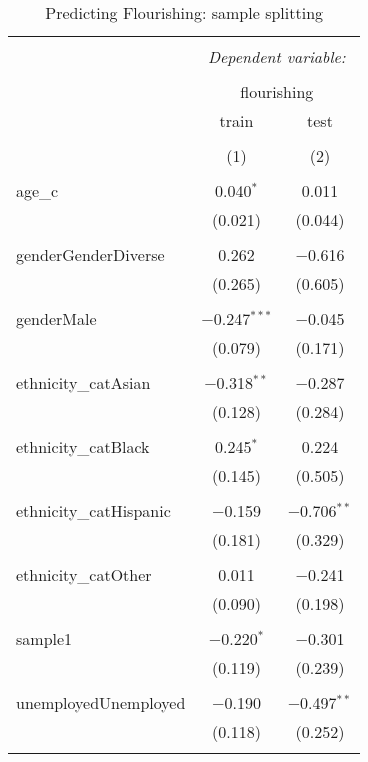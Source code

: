 \documentclass[
]{article}
\begin{document}
\begin{table}[!htbp] \centering 
  \caption{Predicting Flourishing: sample splitting} 
  \label{} 
\begin{tabular}{@{\extracolsep{5pt}}lcc} 
\\[-1.8ex]\hline 
\hline \\[-1.8ex] 
 & \multicolumn{2}{c}{\textit{Dependent variable:}} \\ 
\cline{2-3} 
\\[-1.8ex] & \multicolumn{2}{c}{flourishing} \\ 
 & train & test \\ 
\\[-1.8ex] & (1) & (2)\\ 
\hline \\[-1.8ex] 
 age\_c & 0.040$^{*}$ & 0.011 \\ 
  & (0.021) & (0.044) \\ 
  & & \\ 
 genderGenderDiverse & 0.262 & $-$0.616 \\ 
  & (0.265) & (0.605) \\ 
  & & \\ 
 genderMale & $-$0.247$^{***}$ & $-$0.045 \\ 
  & (0.079) & (0.171) \\ 
  & & \\ 
 ethnicity\_catAsian & $-$0.318$^{**}$ & $-$0.287 \\ 
  & (0.128) & (0.284) \\ 
  & & \\ 
 ethnicity\_catBlack & 0.245$^{*}$ & 0.224 \\ 
  & (0.145) & (0.505) \\ 
  & & \\ 
 ethnicity\_catHispanic & $-$0.159 & $-$0.706$^{**}$ \\ 
  & (0.181) & (0.329) \\ 
  & & \\ 
 ethnicity\_catOther & 0.011 & $-$0.241 \\ 
  & (0.090) & (0.198) \\ 
  & & \\ 
 sample1 & $-$0.220$^{*}$ & $-$0.301 \\ 
  & (0.119) & (0.239) \\ 
  & & \\ 
 unemployedUnemployed & $-$0.190 & $-$0.497$^{**}$ \\ 
  & (0.118) & (0.252) \\ 
  & & \\ 

\end{tabular}
\end{table}
\end{document}
